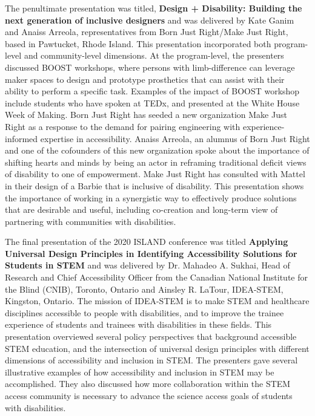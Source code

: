 \documentclass[11.5pt]{sig-alternate}
\begin{document}
\begin{large}
The penultimate presentation was titled, \textbf{Design + Disability: Building the next generation of inclusive designers} and was delivered by Kate Ganim and Anaiss Arreola, representatives from Born Just Right/Make Just Right, based in Pawtucket, Rhode Island. This presentation incorporated both program-level and community-level dimensions.  At the program-level, the presenters discussed BOOST workshops, where persons with limb-difference  can leverage maker spaces to design and prototype prosthetics that can assist with their ability to perform a specific task. Examples of the impact of BOOST workshop include students who have spoken at TEDx, and presented at the White House Week of Making. Born Just Right has seeded a new organization Make Just Right as a response to the demand for pairing engineering with experience-informed expertise in accessibility. Anaiss Arreola, an alumnus of Born Just Right and one of the cofounders of this new organization spoke about the importance of shifting hearts and minds by being an actor in reframing traditional deficit views of disability to one of empowerment. Make Just Right has consulted with Mattel in their design of a Barbie that is inclusive of disability. This presentation shows the importance of working in a synergistic way to effectively produce solutions that are desirable and useful, including co-creation and long-term view of partnering with communities with disabilities. 

The final presentation of the 2020 ISLAND conference was titled \textbf{Applying Universal Design Principles in Identifying Accessibility Solutions for Students in STEM} and was delivered by Dr. Mahadeo A. Sukhai, Head of Research and Chief Accessibility Officer from the Canadian National Institute for the Blind (CNIB), Toronto, Ontario and Ainsley R. LaTour, IDEA-STEM, Kingston, Ontario. The mission of IDEA-STEM is to make STEM and healthcare disciplines accessible to people with disabilities, and to improve the trainee experience of students and trainees with disabilities in these fields. This presentation overviewed several policy perspectives that background accessible STEM education, and the intersection of universal design principles with different dimensions of accessibility and inclusion in STEM. The presenters gave several illustrative examples of how accessibility and inclusion in STEM may be accomplished. They also discussed how more collaboration within the STEM access community is necessary to advance the science access goals of students with disabilities.


\end{large}
\end{document}

